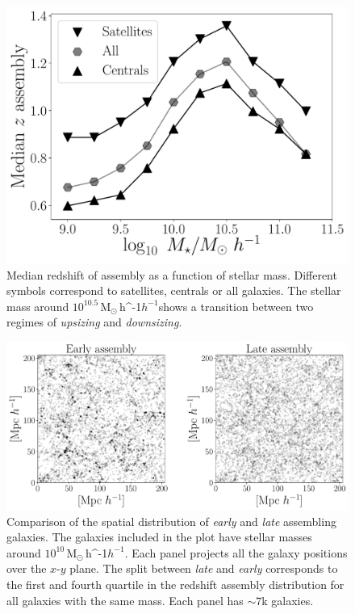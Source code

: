 \documentclass[a4paper,fleqn,usenatbib]{mnras}
\newcommand{\Msunh}{\,{\rm M}$_{\odot}$\,\ifmmode h^{-1}\else $h^{-1}$\fi}
\begin{document}
\begin{figure}
    \centering
    \includegraphics[width=1\columnwidth]{figuras/median_assembly.pdf}
    \caption{Median redshift of assembly as a function of stellar mass.
    Different symbols correspond to satellites, centrals or all galaxies.
    The stellar mass around $10^{10.5}$\Msunh shows a transition between two 
    regimes of \emph{upsizing} and \emph{downsizing}.}
    \label{fig:median_assembly}
\end{figure}


 \begin{figure}
    \centering
    \includegraphics[width=1.8\columnwidth]{figuras/scatter_assembly.pdf}
    \caption{Comparison of the spatial distribution of \emph{early} and \emph{late} assembling galaxies.
    The galaxies included in the plot have stellar masses around $10^{10}$\Msunh. 
    Each panel projects all the galaxy positions over the $x$-$y$ plane. 
    The split between \emph{late} and \emph{early} corresponds to the first and fourth quartile in the redshift assembly distribution for all galaxies with the same mass.
    Each panel has $\sim7$k galaxies. }
    \label{fig:comparison}
\end{figure}
\end{document}
